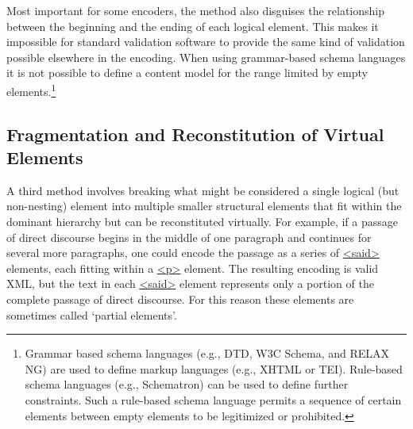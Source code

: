 Most important for some encoders, the method also disguises the relationship between the beginning and the ending of each logical element. This makes it impossible for standard validation software to provide the same kind of validation possible elsewhere in the encoding. When using grammar-based schema languages it is not possible to define a content model for the range limited by empty elements.\footnote{Grammar based schema languages (e.g., DTD, W3C Schema, and RELAX NG) are used to define markup languages (e.g., XHTML or TEI). Rule-based schema languages (e.g., Schematron) can be used to define further constraints. Such a rule-based schema language permits a sequence of certain elements between empty elements to be legitimized or prohibited.}
\subsection[{Fragmentation and Reconstitution of Virtual Elements}]{Fragmentation and Reconstitution of Virtual Elements}\label{NHVE}\par
A third method involves breaking what might be considered a single logical (but non-nesting) element into multiple smaller structural elements that fit within the dominant hierarchy but can be reconstituted virtually. For example, if a passage of direct discourse begins in the middle of one paragraph and continues for several more paragraphs, one could encode the passage as a series of \hyperref[TEI.said]{<said>} elements, each fitting within a \hyperref[TEI.p]{<p>} element. The resulting encoding is valid XML, but the text in each \hyperref[TEI.said]{<said>} element represents only a portion of the complete passage of direct discourse. For this reason these elements are sometimes called ‘partial elements’.\par
